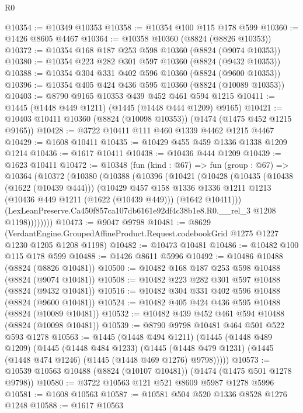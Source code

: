 \begin{lexlean}{R0}
\begin{coremodule}
@10354 := @10349 @10353
@10358 := @10354 @100 @115 @178 @599
@10360 := @1426 @8605 @4467
@10364 := @10358 @10360 (@8824 (@8826 @10353))
@10372 := @10354 @168 @187 @253 @598 @10360 (@8824 (@9074 @10353))
@10380 := @10354 @223 @282 @301 @597 @10360 (@8824 (@9432 @10353))
@10388 := @10354 @304 @331 @402 @596 @10360 (@8824 (@9600 @10353))
@10396 := @10354 @405 @424 @436 @595 @10360 (@8824 (@10089 @10353))
@10403 := @8790 @9165 @10353 @439 @452 @461 @594 @1215
@10411 := @1445 (@1448 @449 @1211) (@1445 (@1448 @444 @1209) @9165)
@10421 := @10403 @10411 @10360 (@8824 (@10098 @10353)) (@1474 (@1475 @452 @1215 @9165))
@10428 := @3722 @10411 @111 @460 @1339 @4462 @1215 @4467
@10429 := @1608 @10411
@10435 := @10429 @455 @459 @1336 @1338 @1209 @1214
@10436 := @1617 @10411
@10438 := @10436 @444 @1209
@10439 := @1623 @10411
@10472 := @10348
    (fun (kind : @67) =>
    fun (group : @67) =>
    @10364
      (@10372
        (@10380
          (@10388
            (@10396
              (@10421
                (@10428
                  (@10435
                    (@10438 (@1622 (@10439 @444)))
                    (@10429
                      @457
                      @158
                      @1336
                      @1336
                      @1211
                      @1213
                      (@10436 @449 @1211 (@1622 (@10439 @449)))
                      (@1642 @10411)))
                  (LexLeanPreserve.Ca450f857ca107db6161e92df4c38b1e8.R0.__rel_3 @1208 @1198))))))))
@10473 := @9047 @9798
@10481 := @8629
    (VerdantEngine.GroupedAffineProduct.Request.codebookGrid @1275 @1227 @1230 @1205 @1208 @1198)
@10482 := @10473 @10481
@10486 := @10482 @100 @115 @178 @599
@10488 := @1426 @8611 @5996
@10492 := @10486 @10488 (@8824 (@8826 @10481))
@10500 := @10482 @168 @187 @253 @598 @10488 (@8824 (@9074 @10481))
@10508 := @10482 @223 @282 @301 @597 @10488 (@8824 (@9432 @10481))
@10516 := @10482 @304 @331 @402 @596 @10488 (@8824 (@9600 @10481))
@10524 := @10482 @405 @424 @436 @595 @10488 (@8824 (@10089 @10481))
@10532 := @10482 @439 @452 @461 @594 @10488 (@8824 (@10098 @10481))
@10539 := @8790 @9798 @10481 @464 @501 @522 @593 @1278
@10563 := @1445
    (@1448 @494 @1211)
    (@1445
      (@1448 @489 @1209)
      (@1445
        (@1448 @484 @1233)
        (@1445 (@1448 @479 @1231) (@1445 (@1448 @474 @1246) (@1445 (@1448 @469 @1276) @9798)))))
@10573 := @10539 @10563 @10488 (@8824 (@10107 @10481)) (@1474 (@1475 @501 @1278 @9798))
@10580 := @3722 @10563 @121 @521 @8609 @5987 @1278 @5996
@10581 := @1608 @10563
@10587 := @10581 @504 @520 @1336 @8528 @1276 @1248
@10588 := @1617 @10563

\end{coremodule}
\end{lexlean}
